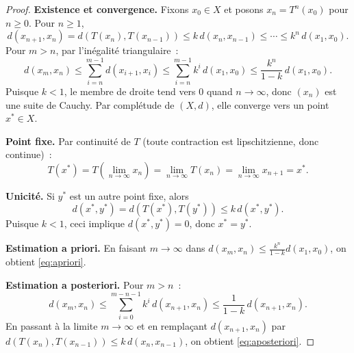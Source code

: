 \begin{proof}
\textbf{Existence et convergence.}
Fixons $x_0 \in X$ et posons $x_n = T^n(x_0)$ pour $n \geq 0$. Pour $n \geq 1$,
\[
    d(x_{n+1}, x_n) = d(T(x_n), T(x_{n-1})) \leq k \, d(x_n, x_{n-1})
    \leq \cdots \leq k^n \, d(x_1, x_0).
\]
Pour $m > n$, par l'in\'egalit\'e triangulaire~:
\[
    d(x_m, x_n) \leq \sum_{i=n}^{m-1} d(x_{i+1}, x_i)
    \leq \sum_{i=n}^{m-1} k^i \, d(x_1, x_0)
    \leq \frac{k^n}{1 - k} \, d(x_1, x_0).
\]
Puisque $k < 1$, le membre de droite tend vers $0$ quand $n \to \infty$, donc
$(x_n)$ est une suite de Cauchy. Par compl\'etude de $(X, d)$, elle converge vers
un point $x^* \in X$.

\textbf{Point fixe.}
Par continuit\'e de $T$ (toute contraction est lipschitzienne, donc continue)~:
\[
    T(x^*) = T\left(\lim_{n \to \infty} x_n\right) = \lim_{n \to \infty} T(x_n)
    = \lim_{n \to \infty} x_{n+1} = x^*.
\]

\textbf{Unicit\'e.}
Si $y^*$ est un autre point fixe, alors
\[
    d(x^*, y^*) = d(T(x^*), T(y^*)) \leq k \, d(x^*, y^*).
\]
Puisque $k < 1$, ceci implique $d(x^*, y^*) = 0$, donc $x^* = y^*$.

\textbf{Estimation a priori.}
En faisant $m \to \infty$ dans $d(x_m, x_n) \leq \frac{k^n}{1-k} d(x_1, x_0)$,
on obtient \eqref{eq:apriori}.

\textbf{Estimation a posteriori.}
Pour $m > n$~:
\[
    d(x_m, x_n) \leq \sum_{i=0}^{m-n-1} k^i \, d(x_{n+1}, x_n)
    \leq \frac{1}{1-k} \, d(x_{n+1}, x_n).
\]
En passant \`a la limite $m \to \infty$ et en rempla\c{c}ant $d(x_{n+1}, x_n)$
par $d(T(x_n), T(x_{n-1})) \leq k \, d(x_n, x_{n-1})$, on obtient
\eqref{eq:aposteriori}.
\end{proof}

\begin{center}
\end{center}

